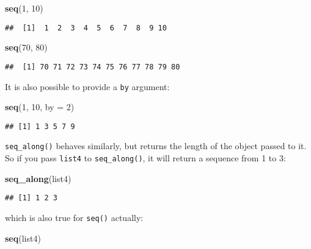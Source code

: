 \documentclass[
]{article}
\newenvironment{Shaded}{\begin{snugshade}}{\end{snugshade}}
\newcommand{\DataTypeTok}[1]{\textcolor[rgb]{0.13,0.29,0.53}{#1}}
\newcommand{\DecValTok}[1]{\textcolor[rgb]{0.00,0.00,0.81}{#1}}
\newcommand{\KeywordTok}[1]{\textcolor[rgb]{0.13,0.29,0.53}{\textbf{#1}}}
\newcommand{\NormalTok}[1]{#1}
\begin{document}
\begin{Shaded}
\begin{Highlighting}[]
\KeywordTok{seq}\NormalTok{(}\DecValTok{1}\NormalTok{, }\DecValTok{10}\NormalTok{)}
\end{Highlighting}
\end{Shaded}

\begin{verbatim}
##  [1]  1  2  3  4  5  6  7  8  9 10
\end{verbatim}

\begin{Shaded}
\begin{Highlighting}[]
\KeywordTok{seq}\NormalTok{(}\DecValTok{70}\NormalTok{, }\DecValTok{80}\NormalTok{)}
\end{Highlighting}
\end{Shaded}

\begin{verbatim}
##  [1] 70 71 72 73 74 75 76 77 78 79 80
\end{verbatim}

It is also possible to provide a \texttt{by} argument:

\begin{Shaded}
\begin{Highlighting}[]
\KeywordTok{seq}\NormalTok{(}\DecValTok{1}\NormalTok{, }\DecValTok{10}\NormalTok{, }\DataTypeTok{by =} \DecValTok{2}\NormalTok{)}
\end{Highlighting}
\end{Shaded}

\begin{verbatim}
## [1] 1 3 5 7 9
\end{verbatim}

\texttt{seq\_along()} behaves similarly, but returns the length of the object passed to it. So if you pass \texttt{list4} to
\texttt{seq\_along()}, it will return a sequence from 1 to 3:

\begin{Shaded}
\begin{Highlighting}[]
\KeywordTok{seq\_along}\NormalTok{(list4)}
\end{Highlighting}
\end{Shaded}

\begin{verbatim}
## [1] 1 2 3
\end{verbatim}

which is also true for \texttt{seq()} actually:

\begin{Shaded}
\begin{Highlighting}[]
\KeywordTok{seq}\NormalTok{(list4)}
\end{Highlighting}
\end{Shaded}
\end{document}
